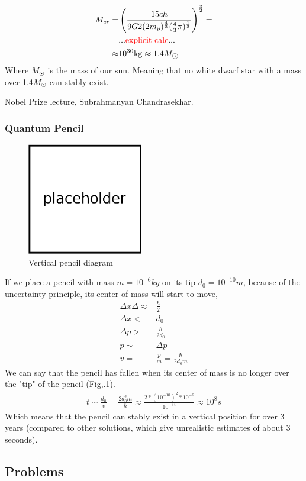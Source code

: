 			\begin{align}
				M_{cr} =& \left( \frac{15 c \hbar}{9 G 2(2m_p)^{\frac{4}{3}}(\frac{4}{3} \pi)^{\frac{1}{3}}} \right)^{\frac{3}{2}} = \\
				&... \hl{\text{explicit calc}} ... \nonumber\\ 
				\approx& 10^{30} \si{kg} \approx 1.4 M_{\astrosun}
			\end{align} 
			Where $M_{\astrosun}$ is the mass of our sun. Meaning that no white dwarf star with a mass over 1.4$M_{\astrosun}$ can stably exist.
			
			Nobel Prize lecture, Subrahmanyan Chandrasekhar\cite{chandrasekhar1984stars}.
		\subsubsection{Quantum Pencil}
			\begin{figure}[!h]
				\centering
				\includegraphics[width=0.45\textwidth]{./figs/placeholder.eps}
				\caption{Vertical pencil diagram}
				\label{pencil}
			\end{figure}
			
			If we place a pencil with mass $m = 10^{-6}\si{kg}$ on its tip $d_0 = 10^{-10}\si{m}$, because of the uncertainty principle, its center of mass will start to move,
			\begin{align}
				\Delta x \Delta \approx& \frac{\hbar}{2} \\
				\Delta x <& d_0 \\
				\Delta p >& \frac{\hbar}{2 d_0} \\
				p \sim& \Delta p \\
				v =& \frac{p}{m} = \frac{\hbar}{2 d_0 m}
			\end{align}
			We can say that the pencil has fallen when its center of mass is no longer over the "tip" of the pencil (Fig,.\ref{pencil}).
			\begin{align}
				t \sim \frac{d_0}{v} = \frac{2d_0^2m}{\hbar} \approx \frac{2 * (10^{-10})^2 * 10^{-6}}{10^{-34}} \approx 10^8 \si{s}
			\end{align}
			Which means that the pencil can stably exist in a vertical position for over 3 years (compared to other solutions, which give unrealistic estimates of about 3 seconds)\cite{easton2007quantum}.
		
	\subsection{Problems}
	